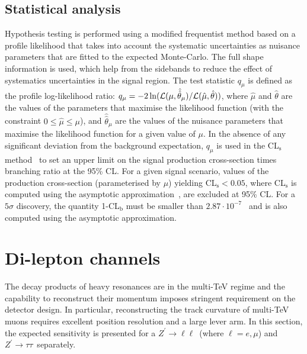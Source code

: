 \documentclass[a4paper,11pt]{article}
\newcommand*{\Zptata}{\ensuremath{Z^{\prime}\rightarrow \tau\tau}}
\newcommand*{\Zpll}{\ensuremath{Z^{\prime}\rightarrow \ell\ell}}
\begin{document}
\subsection{Statistical analysis}
Hypothesis testing is performed using a modified frequentist method based on a profile likelihood that takes into account the systematic uncertainties as nuisance parameters that are fitted to the expected Monte-Carlo. The full shape information is used, which help from the sidebands to reduce the effect of systematics uncertainties in the signal region. The test statistic $q_\mu$ is defined as the profile log-likelihood ratio: $q_\mu = -2\ln({\cal L}(\mu,\hat{\hat{\theta}}_\mu)/{\cal L}(\hat{\mu},\hat{\theta}))$, where $\hat{\mu}$ and $\hat{\theta}$ are the values of the parameters that maximise the likelihood function (with the constraint $0\leq \hat{\mu} \leq \mu$), and $\hat{\hat{\theta}}_\mu$ are the values of the nuisance parameters that maximise the likelihood function for a given value of $\mu$. In the absence of any significant deviation from the background expectation, $q_\mu$ is used in the CL$_\text{s}$ method~\cite{Junk:1999kv,Read:2002hq} to set an upper limit on the signal production cross-section times branching ratio at the 95\% CL. For a given signal scenario, values of the production cross-section (parameterised by $\mu$) yielding CL$_\text{s} < 0.05$, where CL$_\text{s}$ is computed using the asymptotic approximation~\cite{Cowan:2010js}, are excluded at 95\% CL. For a $5\sigma$ discovery, the quantity 1-CL$_\text{b}$ must be smaller than $2.87 \cdot 10^{-7}$~\cite{Junk:1999kv} and is also computed using the asymptotic approximation.



\section{Di-lepton channels}
\label{sec:lep}

The decay products of heavy resonances are in the multi-TeV regime and the capability to reconstruct their momentum imposes stringent requirement on the detector design. In particular, reconstructing the track curvature of multi-TeV muons requires excellent position resolution and a large lever arm. In this section, the expected sensitivity is presented for a \Zpll\ (where $\ell=e,\mu$) and \Zptata\ separately.

\end{document}
